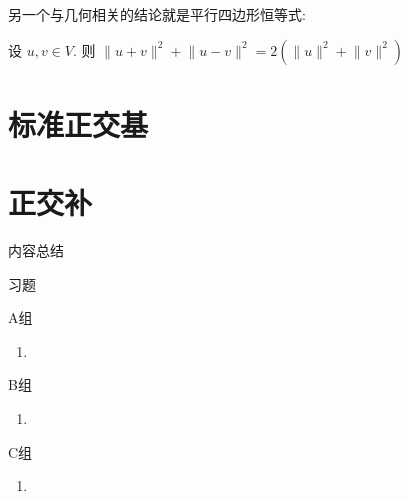 \vspace{2ex}

另一个与几何相关的结论就是平行四边形恒等式:
\begin{theorem}
    设 $u, v \in V$. 则 $ \lVert u + v \rVert^{2} + \lVert u - v \rVert^{2} = 2(\lVert u \rVert^{2} + \lVert v \rVert^{2})$
\end{theorem}


\section{标准正交基}

\section{正交补}

\vspace{2ex} 
\centerline{\heiti \Large 内容总结}

\vspace{2ex} 

\centerline{\heiti \Large 习题}
\vspace{2ex} 
{\kaishu }
\begin{flushright}
    \kaishu

\end{flushright}
\centerline{\heiti A组}
\begin{enumerate}
	\item 
\end{enumerate}
\centerline{\heiti B组}
\begin{enumerate}
	\item 
\end{enumerate}
\centerline{\heiti C组}
\begin{enumerate}
	\item 
\end{enumerate}